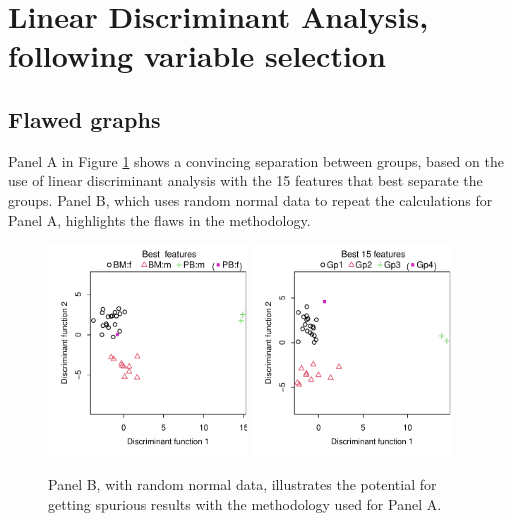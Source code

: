 \documentclass{article}\usepackage[]{graphicx}\usepackage[]{xcolor}
\newenvironment{knitrout}{}{} %
\begin{document}
\section{Linear Discriminant Analysis, following variable selection}

\subsection*{Flawed graphs}

Panel A in Figure \ref{fig:biased} shows a convincing separation between
groups, based on the use of linear discriminant analysis with the 15 features
that best separate the groups.  Panel B, which uses random normal data to repeat 
the calculations for Panel A, highlights the flaws in the methodology.



\begin{figure}[h]
\begin{knitrout}
\color{fgcolor}

{\centering \includegraphics[width=0.47\textwidth]{figs/key-misleading-plots-1} 
\includegraphics[width=0.47\textwidth]{figs/key-misleading-plots-2} 

}


\end{knitrout}
\caption{Panel B, with random normal data, illustrates the potential for
getting spurious results with the methodology used for Panel A.}\label{fig:biased}
\end{figure}
\end{document}
